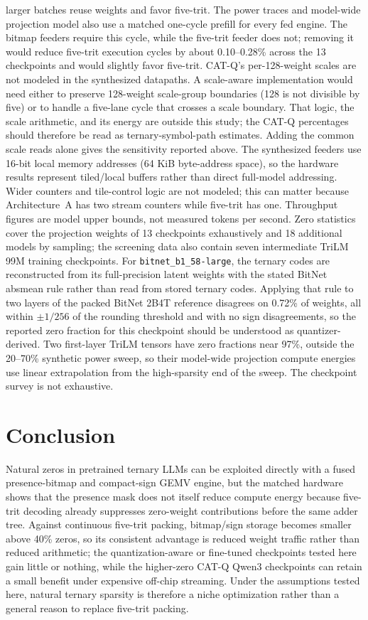 \documentclass[11pt]{article}
\begin{document}
larger batches reuse weights and favor five-trit. The power traces and model-wide projection model also use a matched one-cycle prefill for every fed engine. The bitmap feeders require this cycle, while the five-trit feeder does not; removing it would reduce five-trit execution cycles by about 0.10--0.28\% across the 13 checkpoints and would slightly favor five-trit. CAT-Q's per-128-weight scales are not modeled in the synthesized datapaths. A scale-aware implementation would need either to preserve 128-weight scale-group boundaries (128 is not divisible by five) or to handle a five-lane cycle that crosses a scale boundary. That logic, the scale arithmetic, and its energy are outside this study; the CAT-Q percentages should therefore be read as ternary-symbol-path estimates. Adding the common scale reads alone gives the sensitivity reported above.
The synthesized feeders use 16-bit local memory addresses (64 KiB byte-address space), so the hardware results represent tiled/local buffers rather than direct full-model addressing. Wider counters and tile-control logic are not modeled; this can matter because Architecture~A has two stream counters while five-trit has one. Throughput figures are model upper bounds, not measured tokens per second.
Zero statistics cover the projection weights of 13 checkpoints exhaustively and 18 additional models
by sampling; the screening data also contain seven intermediate TriLM 99M
training checkpoints. For \texttt{bitnet\_b1\_58-large}, the ternary codes are reconstructed from its full-precision latent weights with the stated BitNet absmean rule rather than read from stored ternary codes. Applying that rule to two layers of the packed BitNet 2B4T reference disagrees on 0.72\% of weights, all within $\pm1/256$ of the rounding threshold and with no sign disagreements, so the reported zero fraction for this checkpoint should be understood as quantizer-derived. Two first-layer TriLM tensors have zero fractions near
97\%, outside the 20--70\% synthetic power sweep, so their model-wide projection
compute energies use linear extrapolation from the high-sparsity end of the sweep. The checkpoint survey is not exhaustive.

\section{Conclusion}

Natural zeros in pretrained ternary LLMs can be exploited directly with a fused presence-bitmap and compact-sign GEMV engine, but the matched hardware shows that the presence mask does not itself reduce compute energy because five-trit decoding already suppresses zero-weight contributions before the same adder tree. Against continuous five-trit packing, bitmap/sign storage becomes smaller above 40\% zeros, so its consistent advantage is reduced weight traffic rather than reduced arithmetic; the quantization-aware or fine-tuned checkpoints tested here gain little or nothing, while the higher-zero CAT-Q Qwen3 checkpoints can retain a small benefit under expensive off-chip streaming. Under the assumptions tested here, natural ternary sparsity is therefore a niche optimization rather than a general reason to replace five-trit packing.
\end{document}
